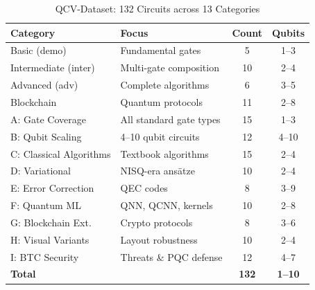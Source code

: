 \documentclass[conference]{IEEEtran}
\begin{document}
\begin{table}[t]
\centering
\caption{QCV-Dataset: 132 Circuits across 13 Categories}
\label{tab:dataset}
\small
\begin{tabular}{@{}llcc@{}}
\toprule
Category & Focus & Count & Qubits \\
\midrule
Basic (demo) & Fundamental gates & 5 & 1--3 \\
Intermediate (inter) & Multi-gate composition & 10 & 2--4 \\
Advanced (adv) & Complete algorithms & 6 & 3--5 \\
Blockchain & Quantum protocols & 11 & 2--8 \\
\midrule
A: Gate Coverage & All standard gate types & 15 & 1--3 \\
B: Qubit Scaling & 4--10 qubit circuits & 12 & 4--10 \\
C: Classical Algorithms & Textbook algorithms & 15 & 2--4 \\
D: Variational & NISQ-era ans\"{a}tze & 10 & 2--4 \\
E: Error Correction & QEC codes & 8 & 3--9 \\
F: Quantum ML & QNN, QCNN, kernels & 10 & 2--8 \\
G: Blockchain Ext. & Crypto protocols & 8 & 3--6 \\
H: Visual Variants & Layout robustness & 10 & 2--4 \\
I: BTC Security & Threats \& PQC defense & 12 & 4--7 \\
\midrule
\multicolumn{2}{l}{\textbf{Total}} & \textbf{132} & \textbf{1--10} \\
\bottomrule
\end{tabular}
\end{table}
\end{document}
